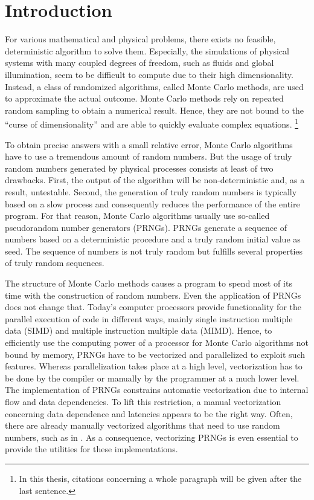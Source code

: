 \documentclass{stdlocal}
\begin{document}
\section{Introduction} %
\label{sec:introduction}

For various mathematical and physical problems, there exists no feasible, deterministic algorithm to solve them.
Especially, the simulations of physical systems with many coupled degrees of freedom, such as fluids and global illumination, seem to be difficult to compute due to their high dimensionality.
Instead, a class of randomized algorithms, called Monte Carlo methods, are used to approximate the actual outcome.
Monte Carlo methods rely on repeated random sampling to obtain a numerical result.
Hence, they are not bound to the \enquote{curse of dimensionality} and are able to quickly evaluate complex equations.
\autocite{pharr2016,bauke2007,mueller2012,landau2014}\footnote{In this thesis, citations concerning a whole paragraph will be given after the last sentence.}

To obtain precise answers with a small relative error, Monte Carlo algorithms have to use a tremendous amount of random numbers.
But the usage of truly random numbers generated by physical processes consists at least of two drawbacks.
First, the output of the algorithm will be non-deterministic and, as a result, untestable.
Second, the generation of truly random numbers is typically based on a slow process and consequently reduces the performance of the entire program.
For that reason, Monte Carlo algorithms usually use so-called pseudorandom number generators (PRNGs).
PRNGs generate a sequence of numbers based on a deterministic procedure and a truly random initial value as seed.
The sequence of numbers is not truly random but fulfills several properties of truly random sequences.
\autocite{bauke2007,intel-drng,lecuyer1994,lecuyer2015,lecuyer2017,volchan2002}

The structure of Monte Carlo methods causes a program to spend most of its time with the construction of random numbers.
Even the application of PRNGs does not change that.
Today's computer processors provide functionality for the parallel execution of code in different ways, mainly single instruction multiple data (SIMD) and multiple instruction multiple data (MIMD).
Hence, to efficiently use the computing power of a processor for Monte Carlo algorithms not bound by memory, PRNGs have to be vectorized and parallelized to exploit such features.
Whereas parallelization takes place at a high level, vectorization has to be done by the compiler or manually by the programmer at a much lower level.
The implementation of PRNGs constrains automatic vectorization due to internal flow and data dependencies.
To lift this restriction, a manual vectorization concerning data dependence and latencies appears to be the right way.
Often, there are already manually vectorized algorithms that need to use random numbers, such as in \textcite{blacher2018}.
As a consequence, vectorizing PRNGs is even essential to provide the utilities for these implementations.
\autocite{lecuyer2017,bauke2007,hennessy2019,patterson2014,barash2017,dolbeau2016,intel-optimization-reference,fog2019a,fog2019b,fog2019c,fog2019d,fog2019e}
\end{document}
